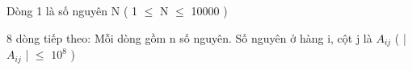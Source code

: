 Dòng 1 là số nguyên N ( 1  $\le$  N  $\le$  10000 )  

   8 dòng tiếp theo: Mỗi dòng gồm n số nguyên. Số nguyên ở hàng i, cột j là $A_{ij}$   ( |$A_{ij}$   |  $\le$  $10^{8}$   )